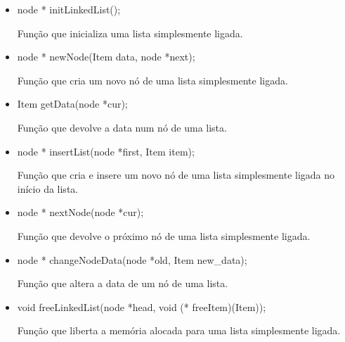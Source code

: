\documentclass[a4paper, 11pt]{article}
\begin{document}
    \begin{itemize}    
    \item node * initLinkedList();
    \par Função que inicializa uma lista simplesmente ligada.
    
    \item node * newNode(Item data, node *next);
    \par Função que cria um novo nó de uma lista simplesmente ligada.
    
    \item Item getData(node *cur);
    \par Função que devolve a data num nó de uma lista.
    
    \item node * insertList(node *first, Item item);
    \par Função que cria e insere um novo nó de uma lista simplesmente ligada no início da lista.
   
    \item node * nextNode(node *cur);
    \par Função que devolve o próximo nó de uma lista simplesmente ligada.
    
    \item node * changeNodeData(node *old, Item new{\_}data);
    \par Função que altera a data de um nó de uma lista.
    
    \item void freeLinkedList(node *head, void (* freeItem)(Item));
    \par Função que liberta a memória alocada para uma lista simplesmente ligada.
    \end{itemize}
\end{document}
